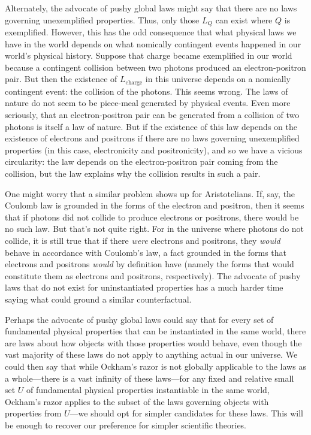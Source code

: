 Alternately, the advocate of pushy global laws might say that there are no laws governing unexemplified properties. 
Thus, only those $L_Q$ can exist where $Q$ is exemplified. However, this has the odd consequence that what physical laws we 
have in the world depends on what nomically contingent events happened in our world's physical history. 
Suppose that charge became exemplified in our world because a contingent collision between two photons produced an
electron-positron pair. But 
then the existence of $L_{\text{charge}}$ in this universe depends on a nomically contingent event: the collision of 
the photons. This seems wrong. The laws of nature do not seem to be piece-meal generated by physical events. Even more 
seriously, that an electron-positron pair can be generated from a collision of two photons is itself a law of nature.
But if the existence of this law depends on the existence of electrons and positrons if there are no laws governing 
unexemplified properties (in this case, electronicity and positronicity), and so we have a vicious circularity: the law
depends on the electron-positron pair coming from the collision, but the law explains why the collision results in such 
a pair.

One might worry that a similar problem shows up for Aristotelians. If, say, the Coulomb law is grounded in the forms of the electron
and positron, then it seems that if photons did not collide to produce electrons or positrons, there would be no such law. But that's not quite right. For 
in the universe 
where photons do not collide, it is still true that if there \textit{were} electrons and positrons, they \textit{would} 
behave in accordance with Coulomb's law, a fact grounded in the forms that electrons and positrons \textit{would} 
by definition have (namely the forms that would constitute them as electrons and positrons, respectively). The 
advocate of pushy laws that do not exist for uninstantiated properties has a much harder time saying what could 
ground a similar counterfactual.

Perhaps the advocate of pushy global laws could say that for every set of fundamental physical properties that can be 
instantiated in the same world, there are laws about how objects with those properties would behave, even though 
the vast majority of these laws do not apply to anything actual in our universe. We could then say that while Ockham's 
razor is not globally applicable to the laws as a whole---there is a vast infinity of these laws---for any fixed and 
relative small set $U$ of fundamental physical properties instantiable in the same world, Ockham's razor applies to 
the subset of the laws governing objects with properties from $U$---we should opt for simpler candidates for these 
laws. This will be enough to recover our preference for simpler scientific theories. 

